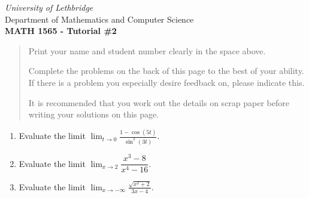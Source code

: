 \documentclass[12pt]{article}
\newcommand{\skipline}{\vspace{12pt}}
\newcommand{\di}{\displaystyle}
\begin{document}
\author{Instructor: Sean Fitzpatrick}
\thispagestyle{empty}
\begin{center}
\emph{University of Lethbridge}\\
Department of Mathematics and Computer Science\\
{\bf MATH 1565 - Tutorial \#2}\\
\end{center}



\vspace{0.1in}

\vspace*{\fill}

\begin{quote}
Print your name and student number clearly in the space above. 

\medskip

Complete the problems on the back of this page to the best of your ability. If there is a problem you especially desire feedback on, please indicate this. 

\medskip

It is recommended that you work out the details on scrap paper before writing your solutions on this page.
\end{quote}
\newpage
\thispagestyle{empty}
\begin{enumerate}
 \item  Evaluate the limit $\di \lim_{t\to 0}\frac{1-\cos(5t)}{\sin^2(3t)}$.
 
 \vspace{2.75in}
 
 \item Evaluate the limit $\di \lim_{x\to 2}\dfrac{x^3-8}{x^4-16}$.
 
 \vspace{2.75in}
 
 \item Evaluate the limit $\di \lim_{x\to -\infty}\frac{\sqrt{x^2+2}}{3x-4}$.
\end{enumerate}
\end{document}
